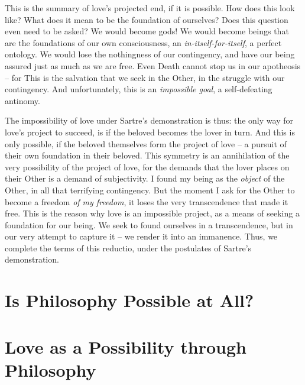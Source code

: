 This is the summary of love's projected end, if it is possible.  How does this look like? What does it mean to be the foundation of ourselves? Does this question even need to be asked? We would become gods! We would become beings that are the foundations of our own consciousness, an \emph{in-itself-for-itself}, a perfect ontology.  We would lose the nothingness of our contingency, and have our being assured just as much as we are free. Even Death cannot stop us in our apotheosis -- for  This is the salvation that we seek in the Other, in the struggle with our contingency. And unfortunately, this is an \emph{impossible goal}, a self-defeating antinomy.

The impossibility of love under Sartre's demonstration is thus: the only way for love's project to succeed, is if the beloved becomes the lover in turn. And this is only possible, if the beloved themselves form the project of love -- a pursuit of their own foundation in their beloved. This symmetry is an annihilation of the very possibility of the project of love, for the demands that the lover places on their Other is a demand of subjectivity. I found my being as the \emph{object} of the Other, in all that terrifying contingency. But the moment I ask for the Other to become a freedom \emph{of my freedom}, it loses the very transcendence that made it free.  This is the reason why love is an impossible project, as a means of seeking a foundation for our being. We seek to found ourselves in a transcendence, but in our very attempt to capture it -- we render it into an immanence. Thus, we complete the terms of this reductio, under the postulates of Sartre's demonstration.

\section{Is Philosophy Possible at All?}

\section{Love as a Possibility through Philosophy}